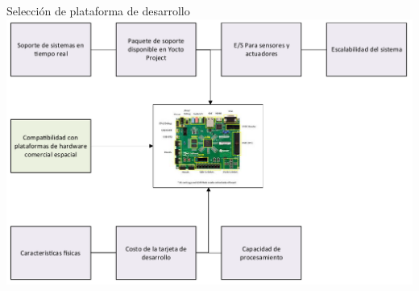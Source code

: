 \documentclass[10pt,aspectratio=169]{beamer} %
\begin{document}
\begin{frame}{Selección de plataforma de desarrollo}
  \centering
  \includegraphics[scale=0.6]{Diagrama_general_del_proyecto/seleccion_tarjeta_desarrollo.pdf}
\end{frame}
\end{document}
